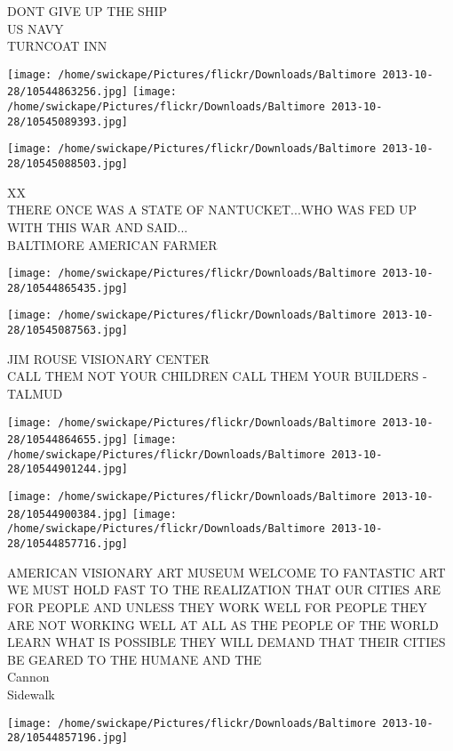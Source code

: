 \documentclass[10pt,letterpaper]{article}
\begin{document}
DONT GIVE UP THE SHIP\\
US NAVY\\
TURNCOAT INN\\
\pagebreak

\texttt{[image: /home/swickape/Pictures/flickr/Downloads/Baltimore 2013-10-28/10544863256.jpg]}
\texttt{[image: /home/swickape/Pictures/flickr/Downloads/Baltimore 2013-10-28/10545089393.jpg]}

\texttt{[image: /home/swickape/Pictures/flickr/Downloads/Baltimore 2013-10-28/10545088503.jpg]}

XX\\
THERE ONCE WAS A STATE OF NANTUCKET...WHO WAS FED UP WITH THIS WAR AND SAID...\\
BALTIMORE AMERICAN FARMER\\
\pagebreak

\texttt{[image: /home/swickape/Pictures/flickr/Downloads/Baltimore 2013-10-28/10544865435.jpg]}

\vspace{0.25in}
\texttt{[image: /home/swickape/Pictures/flickr/Downloads/Baltimore 2013-10-28/10545087563.jpg]}

JIM ROUSE VISIONARY CENTER\\
CALL THEM NOT YOUR CHILDREN CALL THEM YOUR BUILDERS {-} TALMUD\\
\pagebreak

\texttt{[image: /home/swickape/Pictures/flickr/Downloads/Baltimore 2013-10-28/10544864655.jpg]}
\texttt{[image: /home/swickape/Pictures/flickr/Downloads/Baltimore 2013-10-28/10544901244.jpg]}

\texttt{[image: /home/swickape/Pictures/flickr/Downloads/Baltimore 2013-10-28/10544900384.jpg]}
\texttt{[image: /home/swickape/Pictures/flickr/Downloads/Baltimore 2013-10-28/10544857716.jpg]}

AMERICAN VISIONARY ART MUSEUM WELCOME TO FANTASTIC ART\\
WE MUST HOLD FAST TO THE REALIZATION THAT OUR CITIES ARE FOR PEOPLE AND UNLESS THEY WORK WELL FOR PEOPLE THEY ARE NOT WORKING WELL AT ALL AS THE PEOPLE OF THE WORLD LEARN WHAT IS POSSIBLE THEY WILL DEMAND THAT THEIR CITIES BE GEARED TO THE HUMANE AND THE\\
Cannon\\
Sidewalk\\
\pagebreak

\texttt{[image: /home/swickape/Pictures/flickr/Downloads/Baltimore 2013-10-28/10544857196.jpg]}
\end{document}
